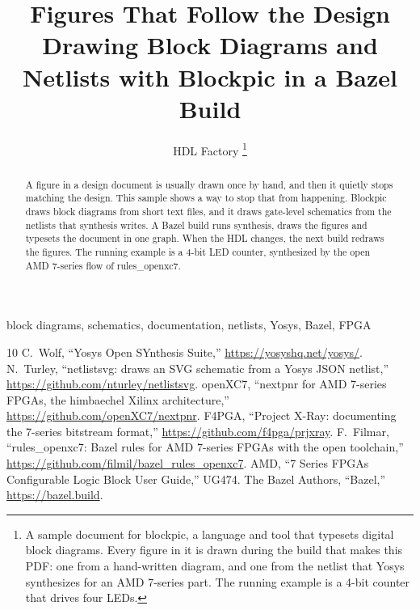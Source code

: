 \documentclass[journal,9pt]{IEEEtran}
\title{Figures That Follow the Design\\{\large Drawing Block Diagrams and
Netlists with Blockpic in a Bazel Build}}
\author{HDL Factory%
\thanks{A sample document for blockpic, a language and tool that typesets
digital block diagrams. Every figure in it is drawn during the build that
makes this PDF: one from a hand-written diagram, and one from the netlist
that Yosys synthesizes for an AMD 7-series part. The running example is a
4-bit counter that drives four LEDs.}}
\theoremstyle{definition}
\theoremstyle{remark}
\begin{document}
\maketitle

\begin{abstract}
A figure in a design document is usually drawn once by hand, and then it
quietly stops matching the design. This sample shows a way to stop that from
happening. Blockpic draws block diagrams from short text files, and it draws
gate-level schematics from the netlists that synthesis writes. A Bazel build
runs synthesis, draws the figures and typesets the document in one graph.
When the HDL changes, the next build redraws the figures. The running
example is a 4-bit LED counter, synthesized by the open AMD 7-series flow of
rules\_openxc7.
\end{abstract}

\begin{IEEEkeywords}
block diagrams, schematics, documentation, netlists, Yosys, Bazel, FPGA
\end{IEEEkeywords}









\begin{thebibliography}{10}
 C.~Wolf, ``Yosys Open SYnthesis Suite,''
  \url{https://yosyshq.net/yosys/}.
 N.~Turley, ``netlistsvg: draws an SVG schematic from a
  Yosys JSON netlist,'' \url{https://github.com/nturley/netlistsvg}.
 openXC7, ``nextpnr for AMD 7-series FPGAs, the himbaechel
  Xilinx architecture,'' \url{https://github.com/openXC7/nextpnr}.
 F4PGA, ``Project X-Ray: documenting the 7-series
  bitstream format,'' \url{https://github.com/f4pga/prjxray}.
 F.~Filmar, ``rules\_openxc7: Bazel rules for AMD
  7-series FPGAs with the open toolchain,''
  \url{https://github.com/filmil/bazel_rules_openxc7}.
 AMD, ``7 Series FPGAs Configurable Logic Block User
  Guide,'' UG474.
 The Bazel Authors, ``Bazel,'' \url{https://bazel.build}.
\end{thebibliography}
\end{document}

